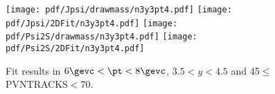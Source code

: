\begin{figure}[H]
\begin{center}
\texttt{[image: pdf/Jpsi/drawmass/n3y3pt4.pdf]}
\texttt{[image: pdf/Jpsi/2DFit/n3y3pt4.pdf]}
\vspace*{-0.5cm}
\texttt{[image: pdf/Psi2S/drawmass/n3y3pt4.pdf]}
\texttt{[image: pdf/Psi2S/2DFit/n3y3pt4.pdf]}
\vspace*{-0.5cm}
\end{center}
\caption{Fit results in $6\gevc<\pt<8\gevc$, $3.5<y<4.5$ and 45$\leq$PVNTRACKS$<$70.}
\label{Fitn3y3pt4}
\end{figure}
